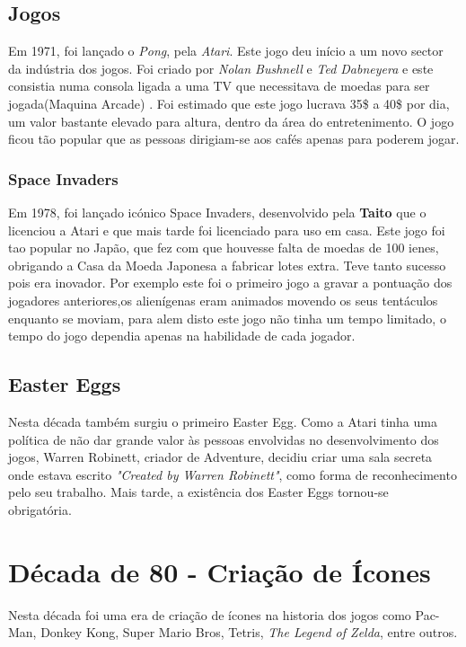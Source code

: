 \documentclass{report}
\begin{document}
\subsection{Jogos}
\label{subsec.jogos}
Em 1971, foi lançado o \textit{Pong}, pela \textit{Atari}. Este jogo deu início a um novo sector da indústria dos jogos. Foi criado por \textit{Nolan Bushnell} e \textit{Ted Dabneyera } e este consistia numa consola ligada a uma TV que necessitava de moedas para ser jogada(Maquina Arcade)   . Foi estimado que este jogo lucrava 35\$ a 40\$ por dia, um valor bastante elevado para altura, dentro da área do entretenimento. O jogo ficou tão popular que as pessoas dirigiam-se aos cafés apenas para poderem jogar.

\subsubsection{Space Invaders}
\label{subsubsec.Space Invaders}
Em 1978, foi lançado icónico Space Invaders, desenvolvido pela \textbf{Taito} que o licenciou a Atari e que mais tarde foi licenciado para uso em casa. Este jogo foi tao popular no Japão, que fez com que houvesse falta de moedas de 100 ienes, obrigando a Casa da Moeda Japonesa a fabricar lotes extra. Teve tanto sucesso pois era inovador. Por exemplo este foi o primeiro jogo a gravar a pontuação dos jogadores anteriores,os alienígenas eram animados movendo os seus tentáculos enquanto se moviam, para alem disto este jogo não tinha um tempo limitado, o tempo do jogo dependia apenas na habilidade de cada jogador.

\subsection{Easter Eggs}
\label{subsec.Easter Eggs}
Nesta década também surgiu o  primeiro Easter Egg. Como a Atari tinha uma política de não dar grande valor às pessoas envolvidas no desenvolvimento dos jogos, Warren Robinett, criador de Adventure, decidiu criar uma sala secreta onde estava escrito \textit{"Created by Warren Robinett"}, como forma de reconhecimento pelo seu trabalho. Mais tarde, a existência dos Easter Eggs tornou-se obrigatória.~

\section{Década de 80 - Criação de Ícones}
\label{sec.Década de 80- Criaçao de Icones}
Nesta década foi uma era de criação de ícones na historia dos jogos como Pac-Man, Donkey Kong, Super Mario Bros, Tetris,  \textit{The Legend of Zelda}, entre outros.
\end{document}
